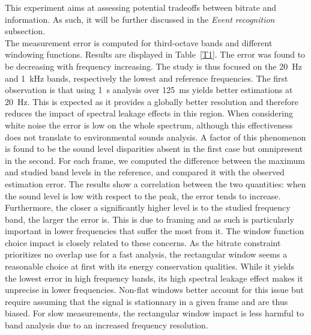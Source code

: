 \documentclass[final,3p,times,twocolumn]{elsarticle}
\begin{document}
This experiment aims at assessing potential tradeoffs between bitrate and information. As such, it will be further discussed in the \textit{Event recognition} subsection.\\

The measurement error is computed for third-octave bands and different windowing functions. Results are displayed in Table~\ref{T1}. The error was found to be decreasing with frequency increasing. The study is thus focused on the 20~Hz and 1~kHz bands, respectively the lowest and reference frequencies. The first observation is that using 1~s analysis over 125~ms yields better estimations at 20~Hz. This is expected as it provides a globally better resolution and therefore reduces the impact of spectral leakage effects in this region. When considering white noise the error is low on the whole spectrum, although this effectiveness does not translate to environmental sounds analysis. A factor of this phenomenon is found to be the sound level disparities absent in the first case but omnipresent in the second. For each frame, we computed the difference between the maximum and studied band levels in the reference, and compared it with the observed estimation error. The results show a correlation between the two quantities: when the sound level is low with respect to the peak, the error tends to increase. Furthermore, the closer a significantly higher level is to the studied frequency band, the larger the error is. This is due to framing and as such is particularly important in lower frequencies that suffer the most from it. The window function choice impact is closely related to these concerns. As the bitrate constraint prioritizes no overlap use for a fast analysis, the rectangular window seems a reasonable choice at first with its energy conservation qualities. While it yields the lowest error in high frequency bands, its high spectral leakage effect makes it unprecise in lower frequencies. Non-flat windows better account for this issue but require assuming that the signal is stationnary in a given frame and are thus biased. For slow measurements, the rectangular window impact is less harmful to band analysis due to an increased frequency resolution.\\
\end{document}
